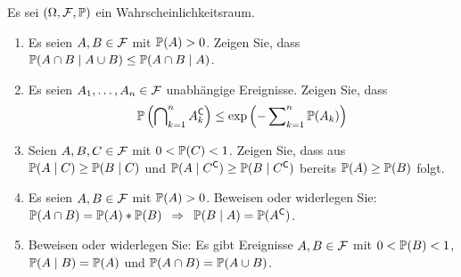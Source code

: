 \begin{exercisePage}
	
	\begin{homework}
		Es sei $(\Omega, \ereignisF, \P)$ ein Wahrscheinlichkeitsraum.
		\begin{enumerate}[leftmargin=*, label=(\alph*), nolistsep]
			\item Es seien $A,B \in \ereignisF$ mit $\P(A) > 0$. Zeigen Sie, dass $\P(A \cap B \mid A \cup B) \leq \P(A \cap B \mid A)$.
			\item Es seien $A_1, \dots , A_n \in \ereignisF$ unabhängige Ereignisse. Zeigen Sie, dass
			\begin{equation*}
				\P \left(\bigcap\nolimits_{k=1}^n A_k^\complement\right) \leq \exp\left(-\sum\nolimits_{k=1}^n \P(A_k) \right)
			\end{equation*}
			\item Seien $A,B,C \in \ereignisF$ mit $0 < \P(C) < 1$. Zeigen Sie, dass aus $\P(A \mid C) \geq \P(B \mid C)$ und $\P(A \mid C^\complement) \geq \P(B \mid C^\complement)$ bereits $\P(A) \geq \P(B)$ folgt.
			\item Es seien $A,B \in \ereignisF$ mit $\P(A) > 0$. Beweisen oder widerlegen Sie: $\P(A \cap B) = \P(A) * \P(B) \follows \P(B \mid A) = \P(A^\complement)$.
			\item Beweisen oder widerlegen Sie: Es gibt Ereignisse $A,B \in \ereignisF$ mit $0 < \P(B) < 1$, $\P(A \mid B) = \P(A)$ und $\P(A \cap B) = \P(A \cup B)$.
		\end{enumerate}
	\end{homework}


\end{exercisePage}
